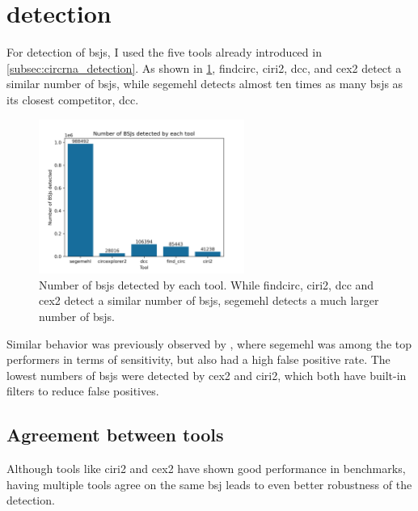 \section{ detection}
\label{sec:bsj_detection}

For detection of \glspl{bsj}, I used the five tools already introduced in
\cref{subsec:circrna_detection}.
As shown in \cref{fig:detection_bars}, \gls{findcirc}, \gls{ciri2}, \gls{dcc},
and \gls{cex2} detect a similar number of \glspl{bsj}, while \gls{segemehl}
detects almost ten times as many \glspl{bsj} as its closest competitor,
\gls{dcc}.

\begin{figure}[H] \centering

    \includegraphics[width=0.6\textwidth]{chapters/4_results_and_discussion/figures/detection/n_bsjs_detected.png}
    \caption{Number of \glspl{bsj} detected by each tool.
        While \gls{findcirc}, \gls{ciri2}, \gls{dcc} and \gls{cex2} detect a similar
        number of \glspl{bsj}, \gls{segemehl} detects a much larger number of
        \glspl{bsj}.
    }
    \label{fig:detection_bars}
\end{figure}
Similar behavior was previously observed by \textcite{zeng_comprehensive_2017},
where \gls{segemehl} was among the top performers in terms of sensitivity, but
also had a high false positive rate.
The lowest numbers of \glspl{bsj} were detected by \gls{cex2} and \gls{ciri2},
which both have built-in filters to reduce false
positives\supercite{zhang_diverse_2016,gao_circular_2018}.

\subsection{Agreement between tools}

Although tools like \gls{ciri2} and \gls{cex2} have shown good performance in
benchmarks\supercite{zeng_comprehensive_2017}, having multiple tools agree on
the same \gls{bsj} leads to even better robustness of the
detection\supercite{hansen_comparison_2016}.

